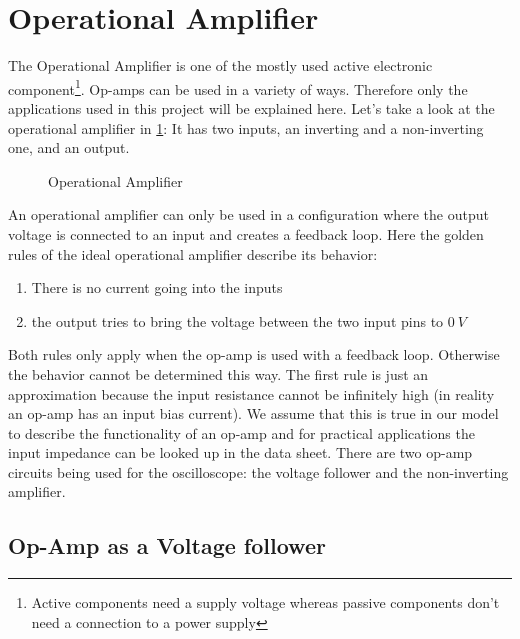 \section{Operational Amplifier}

The Operational Amplifier is one of the mostly used active electronic component\footnote{Active components need a supply voltage whereas passive components don't need a connection to a power supply}. Op-amps can be used in a variety of ways. Therefore only the applications used in this project will be explained here. Let's take a look at the operational amplifier in \cref{fig:op_amp}: It has two inputs, an inverting and a non-inverting one, and an output.

\begin{figure}[htb]
	\centering
	\caption{Operational Amplifier}
	\label{fig:op_amp}
\end{figure}

An operational amplifier can only be used in a configuration where the output voltage is connected to an input and creates a feedback loop. Here the golden rules of the ideal operational amplifier describe its behavior:
\begin{enumerate}
	\item There is no current going into the inputs
	\item the output tries to bring the voltage between the two input pins to $\SI{0}{V}$
\end{enumerate}

Both rules only apply when the op-amp is used with a feedback loop. Otherwise the behavior cannot be determined this way. The first rule is just an approximation because the input resistance cannot be infinitely high (in reality an op-amp has an input bias current). We assume that this is true in our model to describe the functionality of an op-amp and for practical applications the input impedance can be looked up in the data sheet. There are two op-amp circuits being used for the oscilloscope: the voltage follower and the non-inverting amplifier.

\subsection{Op-Amp as a Voltage follower}

